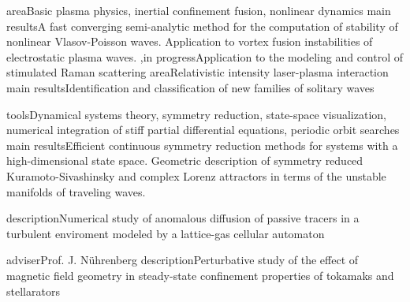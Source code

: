 \documentclass[11pt,a4paper,final]{moderncv}
\begin{document}
		{area}{Basic plasma physics, inertial confinement fusion, nonlinear dynamics}
		{main results}{A fast converging semi-analytic method for the computation of stability of nonlinear {Vlasov-Poisson} waves.
				Application to vortex fusion instabilities of electrostatic plasma waves.}
		{\sep in progress}{Application to the modeling and control of stimulated Raman scattering}
		{area}{Relativistic intensity laser-plasma interaction}
		{main results}{Identification and classification of new families of solitary waves}{}{}

		{tools}{Dynamical systems theory, symmetry reduction, state-space visualization, numerical integration of stiff partial differential equations, periodic orbit searches}
		{main results}{Efficient continuous symmetry reduction methods for systems with a high-dimensional state space.
				Geometric description of symmetry reduced Kuramoto-Sivashinsky and complex Lorenz attractors 
				in terms of the unstable manifolds of traveling waves.
				}

{description}{Numerical study of anomalous diffusion of passive tracers in a turbulent enviroment modeled by
	      a lattice-gas cellular automaton}

{adviser}{Prof. J. N\"{u}hrenberg}
{description}{Perturbative study of the effect of magnetic field geometry in steady-state confinement
	      properties of tokamaks and stellarators}
\end{document}
